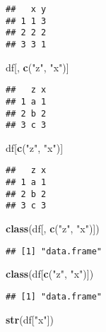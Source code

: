 \documentclass[]{article}
\newenvironment{Shaded}{\begin{snugshade}}{\end{snugshade}}
\newcommand{\KeywordTok}[1]{\textcolor[rgb]{0.13,0.29,0.53}{\textbf{#1}}}
\newcommand{\StringTok}[1]{\textcolor[rgb]{0.31,0.60,0.02}{#1}}
\newcommand{\NormalTok}[1]{#1}
\begin{document}
\begin{verbatim}
##   x y
## 1 1 3
## 2 2 2
## 3 3 1
\end{verbatim}

\begin{Shaded}
\begin{Highlighting}[]
\NormalTok{df[, }\KeywordTok{c}\NormalTok{(}\StringTok{"z"}\NormalTok{, }\StringTok{"x"}\NormalTok{)]}
\end{Highlighting}
\end{Shaded}

\begin{verbatim}
##   z x
## 1 a 1
## 2 b 2
## 3 c 3
\end{verbatim}

\begin{Shaded}
\begin{Highlighting}[]
\NormalTok{df[}\KeywordTok{c}\NormalTok{(}\StringTok{"z"}\NormalTok{, }\StringTok{"x"}\NormalTok{)]}
\end{Highlighting}
\end{Shaded}

\begin{verbatim}
##   z x
## 1 a 1
## 2 b 2
## 3 c 3
\end{verbatim}

\begin{Shaded}
\begin{Highlighting}[]
\KeywordTok{class}\NormalTok{(df[, }\KeywordTok{c}\NormalTok{(}\StringTok{"z"}\NormalTok{, }\StringTok{"x"}\NormalTok{)])}
\end{Highlighting}
\end{Shaded}

\begin{verbatim}
## [1] "data.frame"
\end{verbatim}

\begin{Shaded}
\begin{Highlighting}[]
\KeywordTok{class}\NormalTok{(df[}\KeywordTok{c}\NormalTok{(}\StringTok{"z"}\NormalTok{, }\StringTok{"x"}\NormalTok{)])}
\end{Highlighting}
\end{Shaded}

\begin{verbatim}
## [1] "data.frame"
\end{verbatim}

\begin{Shaded}
\begin{Highlighting}[]
\KeywordTok{str}\NormalTok{(df[}\StringTok{"x"}\NormalTok{])}
\end{Highlighting}
\end{Shaded}
\end{document}
